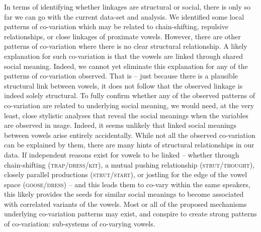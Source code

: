 \documentclass[review]{elsarticle} %
\begin{document}
In terms of identifying whether linkages are structural or social, there is only so far we can go with the current data-set and analysis.   We identified some local patterns of co-variation which may be related to chain-shifting, repulsive relationships, or close linkages of proximate vowels.  However, there are other patterns of co-variation where there is no clear structural relationship.  A likely explanation for such co-variation is that the vowels are linked through shared social meaning. Indeed, we cannot yet eliminate this explanation for any of the patterns of co-variation observed. That is -- just because there is a plausible structural link between vowels, it does not follow that the observed linkage is indeed solely structural. To fully confirm whether any of the observed patterns of co-variation are related to underlying social meaning, we would need, at the very least, close stylistic analyses that reveal the social meanings when the variables are observed in usage. Indeed, it seems unlikely that linked social meanings between vowels arise entirely accidentally.  While not all the observed co-variation can be explained by them, there are many hints of structural relationships in our data.  If independent reasons exist for vowels to be linked -- whether through chain-shifting (\textsc{trap/dress/kit}), a mutual pushing relationship (\textsc{strut/thought}), closely parallel productions (\textsc{strut/start}), or jostling for the edge of the vowel space (\textsc{goose/dress}) -- and this leads them to co-vary within the same speakers, this likely provides the seeds for similar social meanings to become associated with correlated variants of the vowels.  Most or all of the proposed mechanisms underlying co-variation patterns may exist, and conspire to create strong patterns of co-variation: sub-systems of co-varying vowels.
\end{document}
